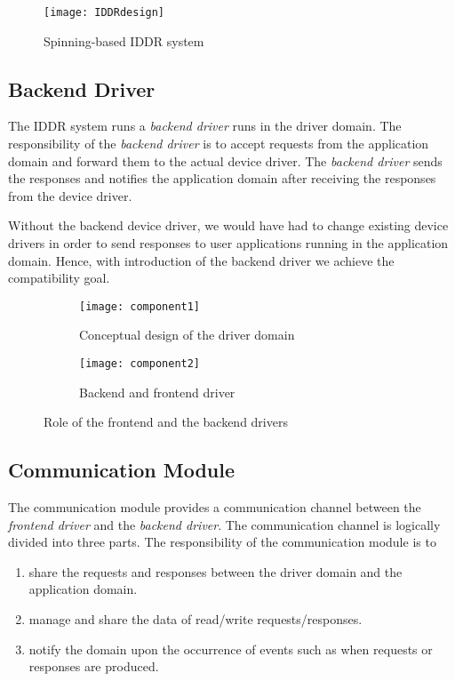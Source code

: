 \begin{figure}[!ht]
\centering
\texttt{[image: IDDRdesign]}
\caption{Spinning-based IDDR system}
\label{fig:new IDDR system}
\end{figure}
\subsection{Backend Driver}
\label{subsec:backend}
The IDDR system runs a \textit{backend driver}
runs in the driver domain. The responsibility of the \textit{backend
driver} is to accept requests from the application domain and forward
them to the actual device driver. The \textit{backend driver} sends
the responses and notifies the application domain after receiving the
responses from the device driver.

Without the backend device driver, we would have had to change existing device
drivers in order to send responses to user applications running in the
application domain. Hence, with introduction of the backend driver we
achieve the compatibility goal.

\begin{figure}[!ht]
    \centering
    \begin{subfigure}[b]{0.45\textwidth}
	\texttt{[image: component1]}
	\caption{Conceptual design of the driver domain}
	\label{fig:conept}
    \end{subfigure}
	\hfill
    \begin{subfigure}[b]{0.45\textwidth}
	\texttt{[image: component2]}
	\caption{Backend and frontend driver}
	\label{fig:backendfrontend}
    \end{subfigure}
    \caption{Role of the frontend and the backend drivers}\label{fig:fault tolerence}
\end{figure}

\subsection{Communication Module}
\label{sub:communicationmodule}

The communication module provides a communication channel between
the \textit{frontend driver} and the \textit{backend driver}. The
communication channel is logically divided into three parts. The
responsibility of the communication module is to

\begin{enumerate} 
\item share the requests and responses between the driver domain and the application domain.
\item manage and share the data of read/write requests/responses.
\item notify the domain upon the occurrence of events such as when requests or responses are produced. 
\end{enumerate}

